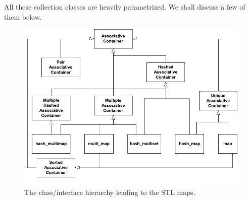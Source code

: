 
All these collection classes are heavily parametrized. We shall discuss
a few of them below.

  \begin{figure}[htb]
    \begin{center}  
      \includegraphics{STL/Maps.pdf}
    \end{center}  
    \caption{The class/interface hierarchy leading to the STL maps.
             \label{figMaps}} 
  \end{figure}


